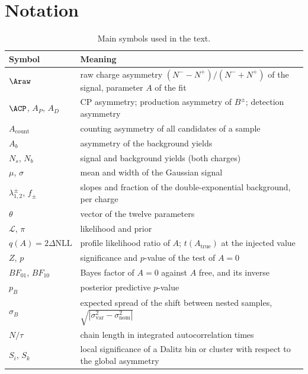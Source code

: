 \section{Notation}
\label{sec:notation}
\begin{table}[h]
\centering
\begin{tabular}{lp{6.2cm}}
\toprule
Symbol & Meaning \\
\midrule
$\Araw$ & raw charge asymmetry $(N^--N^+)/(N^-+N^+)$ of the signal, parameter $A$ of the fit \\
$\ACP$, $A_P$, $A_D$ & CP asymmetry; production asymmetry of $B^\pm$; detection asymmetry \\
$A_{\mathrm{count}}$ & counting asymmetry of all candidates of a sample \\
$A_b$ & asymmetry of the background yields \\
$N_s$, $N_b$ & signal and background yields (both charges) \\
$\mu$, $\sigma$ & mean and width of the Gaussian signal \\
$\lambda_{1,2}^\pm$, $f_\pm$ & slopes and fraction of the double-exponential background, per charge \\
$\theta$ & vector of the twelve parameters \\
$\mathcal L$, $\pi$ & likelihood and prior \\
$q(A)=2\Delta\mathrm{NLL}$ & profile likelihood ratio of $A$; $t(A_{\mathrm{true}})$ at the injected value \\
$Z$, $p$ & significance and $p$-value of the test of $A=0$ \\
$BF_{01}$, $BF_{10}$ & Bayes factor of $A=0$ against $A$ free, and its inverse \\
$p_B$ & posterior predictive $p$-value \\
$\sigma_B$ & expected spread of the shift between nested samples, $\sqrt{|\sigma_{\mathrm{var}}^2-\sigma_{\mathrm{nom}}^2|}$ \\
$N/\tau$ & chain length in integrated autocorrelation times \\
$S_i$, $S_k$ & local significance of a Dalitz bin or cluster with respect to the global asymmetry \\
\bottomrule
\end{tabular}
\caption{Main symbols used in the text.}
\label{tab:notation}
\end{table}
